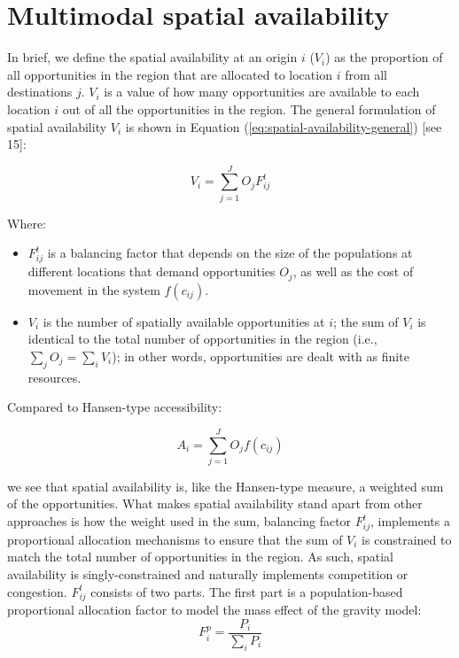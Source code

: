 \documentclass[10pt,letterpaper]{article}
\begin{document}
\hypertarget{multimodal-spatial-availability}{%
\section{Multimodal spatial
availability}\label{multimodal-spatial-availability}}

In brief, we define the spatial availability at an origin \(i\)
(\(V_{i}\)) as the proportion of all opportunities in the region that
are allocated to location \(i\) from all destinations \(j\). \(V_{i}\)
is a value of how many opportunities are available to each location
\(i\) out of all the opportunities in the region. The general
formulation of spatial availability \(V_{i}\) is shown in Equation
(\ref{eq:spatial-availability-general}) {[}see 15{]}:

\begin{equation}
\label{eq:spatial-availability-general}
V_i = \sum_{j=1}^J O_jF^t_{ij}
\end{equation}

\noindent Where:

\begin{itemize}
\item
  \(F^t_{ij}\) is a balancing factor that depends on the size of the
  populations at different locations that demand opportunities \(O_j\),
  as well as the cost of movement in the system \(f(c_{ij})\).
\item
  \(V_i\) is the number of spatially available opportunities at \(i\);
  the sum of \(V_{i}\) is identical to the total number of opportunities
  in the region (i.e., \(\sum_j O_j = \sum_i V_i\)); in other words,
  opportunities are dealt with as finite resources.
\end{itemize}

Compared to Hansen-type accessibility:

\begin{equation}
\label{eq:hansen-accessibility}
A_i = \sum_{j=1}^J O_jf(c_{ij})
\end{equation}

\noindent we see that spatial availability is, like the Hansen-type
measure, a weighted sum of the opportunities. What makes spatial
availability stand apart from other approaches is how the weight used in
the sum, balancing factor \(F^t_{ij}\), implements a proportional
allocation mechanisms to ensure that the sum of \(V_i\) is constrained
to match the total number of opportunities in the region. As such,
spatial availability is singly-constrained and naturally implements
competition or congestion. \(F^t_{ij}\) consists of two parts. The first
part is a population-based proportional allocation factor to model the
mass effect of the gravity model: \[
F^p_{i} = \frac{P_i}{\sum_i P_i}
\]
\end{document}
